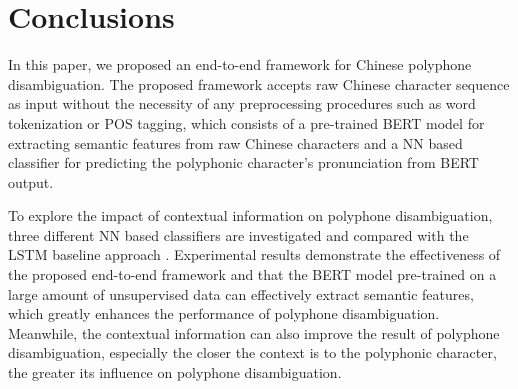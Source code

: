 \documentclass[a4paper]{article}
\begin{document}
\section{Conclusions}

In this paper, we proposed an end-to-end framework for Chinese polyphone disambiguation. The proposed framework accepts raw Chinese character sequence as input without the necessity of any preprocessing procedures such as word tokenization or POS tagging, which consists of a pre-trained BERT model for extracting semantic features from raw Chinese characters and a NN based classifier for predicting the polyphonic character's pronunciation from BERT output.

To explore the impact of contextual information on polyphone disambiguation, three different NN based classifiers are investigated and compared with the LSTM baseline approach \cite{shan2016bi}. Experimental results demonstrate the effectiveness of the proposed end-to-end framework and that the BERT model pre-trained on a large amount of unsupervised data can effectively extract semantic features, which greatly enhances the performance of polyphone disambiguation. Meanwhile, the contextual information can also improve the result of polyphone disambiguation, especially the closer the context is to the polyphonic character, the greater its influence on polyphone disambiguation.







\end{document}
